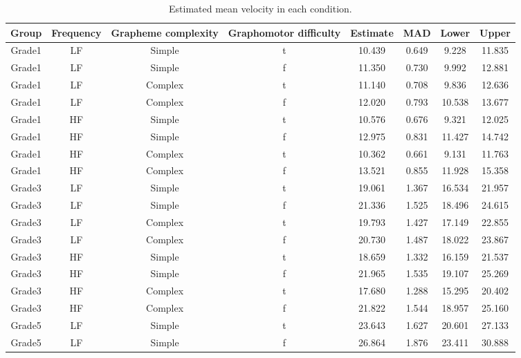 \documentclass[
  11pt,
  english,
  ,doc,mask,floatsintext]{apa6}
\begin{document}
\begin{table}[htb]

\begin{center}
\begin{threeparttable}

\caption{\label{tab:velocity-predictions-summary}Estimated mean velocity in each condition.}

\scriptsize{

\begin{tabular}{cccccccc}
\toprule
Group & \multicolumn{1}{c}{Frequency} & \multicolumn{1}{c}{Grapheme complexity} & \multicolumn{1}{c}{Graphomotor difficulty} & \multicolumn{1}{c}{Estimate} & \multicolumn{1}{c}{MAD} & \multicolumn{1}{c}{Lower} & \multicolumn{1}{c}{Upper}\\
\midrule
Grade1 & LF & Simple & t & 10.439 & 0.649 & 9.228 & 11.835\\
Grade1 & LF & Simple & f & 11.350 & 0.730 & 9.992 & 12.881\\
Grade1 & LF & Complex & t & 11.140 & 0.708 & 9.836 & 12.636\\
Grade1 & LF & Complex & f & 12.020 & 0.793 & 10.538 & 13.677\\
Grade1 & HF & Simple & t & 10.576 & 0.676 & 9.321 & 12.025\\
Grade1 & HF & Simple & f & 12.975 & 0.831 & 11.427 & 14.742\\
Grade1 & HF & Complex & t & 10.362 & 0.661 & 9.131 & 11.763\\
Grade1 & HF & Complex & f & 13.521 & 0.855 & 11.928 & 15.358\\
Grade3 & LF & Simple & t & 19.061 & 1.367 & 16.534 & 21.957\\
Grade3 & LF & Simple & f & 21.336 & 1.525 & 18.496 & 24.615\\
Grade3 & LF & Complex & t & 19.793 & 1.427 & 17.149 & 22.855\\
Grade3 & LF & Complex & f & 20.730 & 1.487 & 18.022 & 23.867\\
Grade3 & HF & Simple & t & 18.659 & 1.332 & 16.159 & 21.537\\
Grade3 & HF & Simple & f & 21.965 & 1.535 & 19.107 & 25.269\\
Grade3 & HF & Complex & t & 17.680 & 1.288 & 15.295 & 20.402\\
Grade3 & HF & Complex & f & 21.822 & 1.544 & 18.957 & 25.160\\
Grade5 & LF & Simple & t & 23.643 & 1.627 & 20.601 & 27.133\\
Grade5 & LF & Simple & f & 26.864 & 1.876 & 23.411 & 30.888\\

\end{tabular}}
\end{threeparttable}
\end{center}
\end{table}
\end{document}
